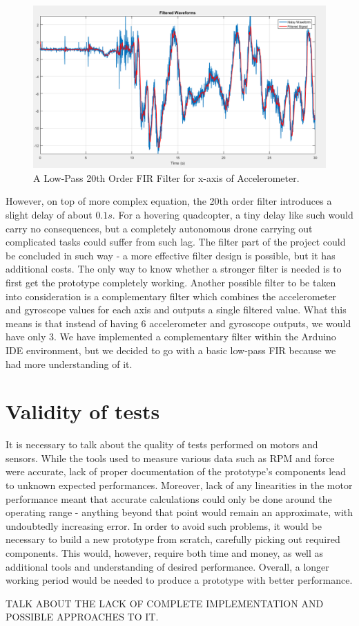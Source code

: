 \begin{figure}[H]
  \centering
    \includegraphics[width=1\textwidth]{images/newFilter.png}
	\caption{A Low-Pass 20th Order FIR Filter for x-axis of Accelerometer.}
	\label{newFilter}
\end{figure}

However, on top of more complex equation, the 20th order filter introduces a slight delay of about $0.1s$. For a hovering quadcopter, a tiny delay like such would carry no consequences, but a completely autonomous drone carrying out complicated tasks could suffer from such lag.
The filter part of the project could be concluded in such way - a more effective filter design is possible, but it has additional costs. The only way to know whether a stronger filter is needed is to first get the prototype completely working.
Another possible filter to be taken into consideration is a complementary filter which combines the accelerometer and gyroscope values for each axis and outputs a single filtered value. What this means is that instead of having 6 accelerometer and gyroscope outputs, we would have only 3. We have implemented a complementary filter within the Arduino IDE environment, but we decided to go with a basic low-pass FIR because we had more understanding of it.

\section{Validity of tests}
It is necessary to talk about the quality of tests performed on motors and sensors. While the tools used to measure various data such as RPM and force were accurate, lack of proper documentation of the prototype's components lead to unknown expected performances. Moreover, lack of any linearities in the motor performance meant that accurate calculations could only be done around the operating range - anything beyond that point would remain an approximate, with undoubtedly increasing error.
In order to avoid such problems, it would be necessary to build a new prototype from scratch, carefully picking out required components. This would, however, require both time and money, as well as additional tools and understanding of desired performance. Overall, a longer working period would be needed to produce a prototype with better performance.

TALK ABOUT THE LACK OF COMPLETE IMPLEMENTATION AND POSSIBLE APPROACHES TO IT.